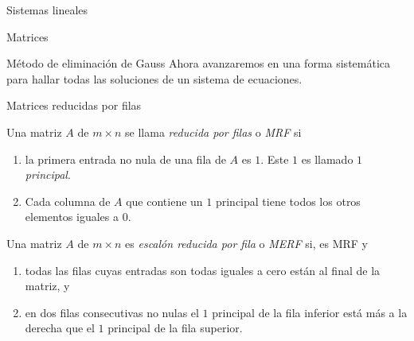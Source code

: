 \begin{chapter}{Sistemas lineales}
\begin{section}{Matrices}
        
        \end{section}
    
    
    
            \begin{section}{Método de eliminación de Gauss }\label{seccion-metodo-de-gauss} Ahora avanzaremos en una forma sistemática para hallar todas las soluciones de un sistema de ecuaciones.
    
            
            \begin{subsection}{Matrices reducidas por filas} 
                
                \begin{definicion}
                    Una matriz $A$ de $m \times n$ se llama \textit{reducida por filas} o \textit{MRF} si 
                    \begin{enumerate}[label=\textit{\alph*)}, ref=\textit{\alph*)}]
                        \item la primera entrada no nula de una fila de $A$ es $1$. Este $1$ es llamado \textit{$1$ principal}.
                        \item Cada columna de $A$ que contiene un  $1$ principal tiene todos los otros elementos iguales a $0$. 
                    \end{enumerate} 
                Una matriz $A$ de $m \times n$ es \textit{escalón reducida por fila} o \textit{MERF} si,  es  MRF y
                \begin{enumerate}[resume*]
                    \item todas las filas cuyas entradas son todas iguales a cero están al final de la matriz, y
                    \item en dos filas consecutivas no nulas el $1$ principal de la fila inferior está más a la derecha que el $1$ principal de la fila superior. 
                \end{enumerate}
                
                \end{definicion} 
                

\end{subsection}
\end{section}
\end{chapter}
